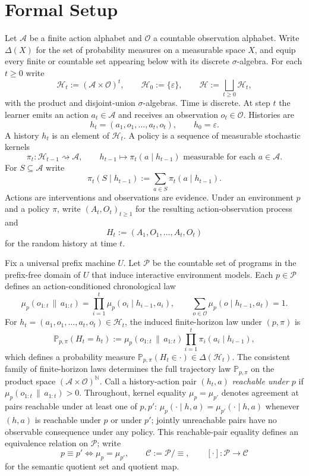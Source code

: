 \documentclass[11pt]{article}
\theoremstyle{definition}
\theoremstyle{remark}
\newcommand{\Acal}{\mathcal{A}}
\newcommand{\Ccal}{\mathcal{C}}
\newcommand{\Ocal}{\mathcal{O}}
\newcommand{\Pcal}{\mathcal{P}}
\newcommand{\Hcal}{\mathcal{H}}
\newcommand{\Prob}{\mathbb{P}}
\newcommand{\givena}{\,\|\,}
\begin{document}
\section{Formal Setup}
\label{sec:setup}

Let $\Acal$ be a finite action alphabet and $\Ocal$ a countable observation alphabet. Write $\Delta(X)$ for the set of probability measures on a measurable space $X$, and equip every finite or countable set appearing below with its discrete $\sigma$-algebra. For each $t\ge 0$ write
\[
\Hcal_t:=(\Acal\times\Ocal)^t,
\qquad
\Hcal_0:=\{\varepsilon\},
\qquad
\Hcal:=\bigsqcup_{t\ge 0}\Hcal_t,
\]
with the product and disjoint-union $\sigma$-algebras. Time is discrete. At step $t$ the learner emits an action $a_t\in\Acal$ and receives an observation $o_t\in\Ocal$. Histories are
\[
h_t=(a_1,o_1,\dots,a_t,o_t),
\qquad
h_0=\varepsilon.
\]
A history $h_t$ is an element of $\Hcal_t$. A policy is a sequence of measurable stochastic kernels
\[
\pi_t:\Hcal_{t-1}\rightsquigarrow \Acal,
\qquad
h_{t-1}\longmapsto \pi_t(a\mid h_{t-1})\text{ measurable for each }a\in\Acal.
\]
For $S\subseteq\Acal$ write
\[
\pi_t(S\mid h_{t-1}):=\sum_{a\in S}\pi_t(a\mid h_{t-1}).
\]
Actions are interventions and observations are evidence. Under an environment $p$ and a policy $\pi$, write $(A_t,O_t)_{t\ge 1}$ for the resulting action-observation process and
\[
H_t:=(A_1,O_1,\dots,A_t,O_t)
\]
for the random history at time $t$.

Fix a universal prefix machine $U$. Let $\Pcal$ be the countable set of programs in the prefix-free domain of $U$ that induce interactive environment models. Each $p\in\Pcal$ defines an action-conditioned chronological law
\[
\mu_p(o_{1:t}\givena a_{1:t})
=
\prod_{i=1}^{t}\mu_p(o_i\mid h_{i-1},a_i),
\qquad
\sum_{o\in\Ocal}\mu_p(o\mid h_{t-1},a_t)=1.
\]
For $h_t=(a_1,o_1,\dots,a_t,o_t)\in\Hcal_t$, the induced finite-horizon law under $(p,\pi)$ is
\[
\Prob_{p,\pi}(H_t=h_t)
:=
\mu_p(o_{1:t}\givena a_{1:t})\prod_{i=1}^t \pi_i(a_i\mid h_{i-1}),
\]
which defines a probability measure $\Prob_{p,\pi}(H_t\in\cdot)\in\Delta(\Hcal_t)$. The consistent family of finite-horizon laws determines the full trajectory law $\Prob_{p,\pi}$ on the product space $(\Acal\times\Ocal)^{\mathbb N}$. Call a history-action pair $(h_t,a)$ \emph{reachable under $p$} if $\mu_p(o_{1:t}\givena a_{1:t})>0$. Throughout, kernel equality $\mu_p=\mu_{p'}$ denotes agreement at pairs reachable under at least one of $p,p'$: $\mu_p(\cdot\mid h,a)=\mu_{p'}(\cdot\mid h,a)$ whenever $(h,a)$ is reachable under $p$ or under $p'$; jointly unreachable pairs have no observable consequence under any policy. This reachable-pair equality defines an equivalence relation on $\Pcal$; write
\[
p\equiv p'
\iff
\mu_p=\mu_{p'},
\qquad
\Ccal:=\Pcal/\!\equiv,
\qquad
[\cdot]:\Pcal\to\Ccal
\]
for the semantic quotient set and quotient map.
\end{document}
